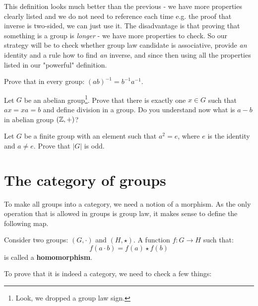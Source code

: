 This definition looks much better than the previous - we have more properties clearly listed and we do not need to reference each time e.g. the proof that inverse is two-sided, we can just use it. The disadvantage
is that proving that something is a group is \emph{longer} - we have more properties to check. So our strategy will be to check whether group law candidate is associative, provide \emph{an} identity and a rule how to find \emph{an} inverse, and since then using all the properties listed in our "powerful" definition.

\begin{exercise}
  Prove that in every group: $(ab)^{-1}=b^{-1}a^{-1}.$
\end{exercise}

\begin{exercise}
  Let $G$ be an abelian group\footnote{Look, we dropped a group law sign.}. Prove that there is exactly one $x\in G$ such that $ax=xa=b$ and define division in a group. Do you understand now what is $a-b$ in abelian group $(\mathbb Z, +)$?
\end{exercise}

\begin{exercise}
  Let $G$ be a finite group with an element such that $a^2=e$, where $e$ is the identity and $a\neq e$. Prove that $|G|$ is odd.
\end{exercise}


\section{The category of groups}
To make all groups into a category, we need a notion of a morphism. As the only operation that is allowed in groups is group law, it makes sense to define the following map.

\begin{definition}
  Consider two groups: $(G,\cdot)$ and $(H, \star)$. A function $f: G\to H$ such that:
  $$f(a\cdot b)=f(a)\star f(b)$$
  is called a \textbf{homomorphism}.
\end{definition}

To prove that it is indeed a category, we need to check a few things:

